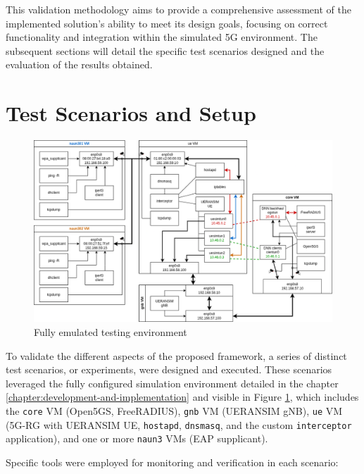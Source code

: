 This validation methodology aims to provide a comprehensive assessment of the implemented solution's ability to meet its design goals, focusing on correct functionality and integration within the simulated \ac{5G} environment. The subsequent sections will detail the specific test scenarios designed and the evaluation of the results obtained.

\section{Test Scenarios and Setup}

\begin{figure}
    \centering
    \includegraphics[width=1\linewidth]{figs/experiments-setup.png}
    \caption{Fully emulated testing environment}
    \label{fig:experiments-setup}
\end{figure}

To validate the different aspects of the proposed framework, a series of distinct test scenarios, or experiments, were designed and executed. These scenarios leveraged the fully configured simulation environment detailed in the chapter \ref{chapter:development-and-implementation} and visible in Figure \ref{fig:experiments-setup}, which includes the \texttt{core} \ac{VM} (Open5GS, FreeRADIUS), \texttt{gnb} \ac{VM} (UERANSIM gNB), \texttt{ue} \ac{VM} (\ac{5G-RG} with UERANSIM UE, \texttt{hostapd}, \texttt{dnsmasq}, and the custom \texttt{interceptor} application), and one or more \texttt{naun3} \acp{VM} (\ac{EAP} supplicant).

Specific tools were employed for monitoring and verification in each scenario:

